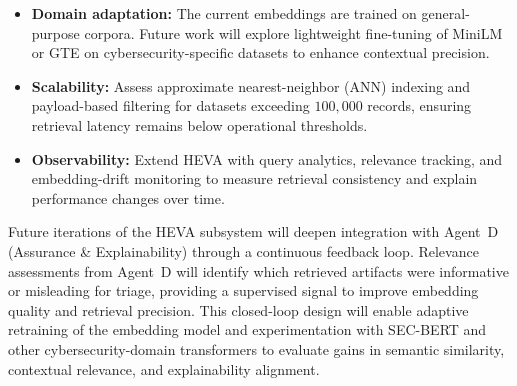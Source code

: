 \documentclass[12pt,a4paper]{article}
\begin{document}
\begin{itemize}[noitemsep]
  \item \textbf{Domain adaptation:} The current embeddings are trained on general-purpose corpora. Future work will explore lightweight fine-tuning of MiniLM or GTE on cybersecurity-specific datasets to enhance contextual precision.
  \item \textbf{Scalability:} Assess approximate nearest-neighbor (ANN) indexing and payload-based filtering for datasets exceeding $100{,}000$ records, ensuring retrieval latency remains below operational thresholds.
  \item \textbf{Observability:} Extend HEVA with query analytics, relevance tracking, and embedding-drift monitoring to measure retrieval consistency and explain performance changes over time.
\end{itemize}

Future iterations of the HEVA subsystem will deepen integration with Agent~D (Assurance \& Explainability) through a continuous feedback loop. 
Relevance assessments from Agent~D will identify which retrieved artifacts were informative or misleading for triage, providing a supervised signal to improve embedding quality and retrieval precision. 
This closed-loop design will enable adaptive retraining of the embedding model and experimentation with SEC-BERT and other cybersecurity-domain transformers to evaluate gains in semantic similarity, contextual relevance, and explainability alignment.
\end{document}
